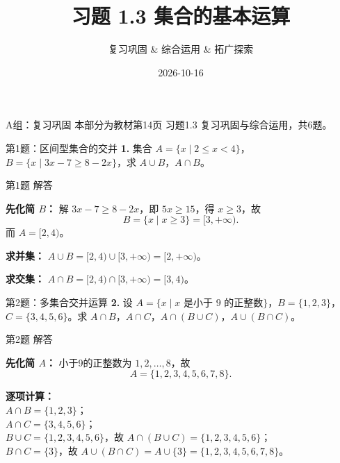\documentclass[10pt,aspectratio=169,serif]{beamer}
\title[习题1.3]{习题 1.3 集合的基本运算}
\subtitle{复习巩固 \& 综合运用 \& 拓广探索}
\author{}
\institute{}
\date{2026-10-16}
\begin{document}
\begin{frame}
  \titlepage
\end{frame}

\begin{frame}[t]{A组：复习巩固}
本部分为教材第14页 习题1.3 复习巩固与综合运用，共6题。
\end{frame}

\begin{frame}[t]{第1题：区间型集合的交并}
\textbf{1.} 集合 $A = \{x \mid 2 \le x < 4\}$，$B = \{x \mid 3x - 7 \ge 8 - 2x\}$，求 $A \cup B$，$A \cap B$。
\end{frame}

\begin{frame}[t]{第1题 解答}
\begin{tcolorbox}[colback=orange!10,colframe=orange,title=\textbf{解}]
\textbf{先化简 $B$：} 解 $3x-7 \ge 8-2x$，即 $5x \ge 15$，得 $x \ge 3$，故
\[
B = \{x \mid x \ge 3\} = [3, +\infty).
\]
而 $A = [2, 4)$。

\textbf{求并集：} $A \cup B = [2, 4) \cup [3, +\infty) = [2, +\infty)$。

\textbf{求交集：} $A \cap B = [2, 4) \cap [3, +\infty) = [3, 4)$。
\end{tcolorbox}
\end{frame}

\begin{frame}[t]{第2题：多集合交并运算}
\textbf{2.} 设 $A = \{x \mid x \text{ 是小于 9 的正整数}\}$，$B = \{1, 2, 3\}$，$C = \{3, 4, 5, 6\}$。求 $A \cap B$，$A \cap C$，$A \cap (B \cup C)$，$A \cup (B \cap C)$。
\end{frame}

\begin{frame}[t]{第2题 解答}
\begin{tcolorbox}[colback=orange!10,colframe=orange,title=\textbf{解}]
\textbf{先化简 $A$：} 小于9的正整数为 $1,2,\dots,8$，故
\[
A = \{1,2,3,4,5,6,7,8\}.
\]

\textbf{逐项计算：}\\
$A \cap B = \{1,2,3\}$；\\
$A \cap C = \{3,4,5,6\}$；\\
$B \cup C = \{1,2,3,4,5,6\}$，故 $A \cap (B \cup C) = \{1,2,3,4,5,6\}$；\\
$B \cap C = \{3\}$，故 $A \cup (B \cap C) = A \cup \{3\} = \{1,2,3,4,5,6,7,8\}$。
\end{tcolorbox}
\end{frame}
\end{document}

